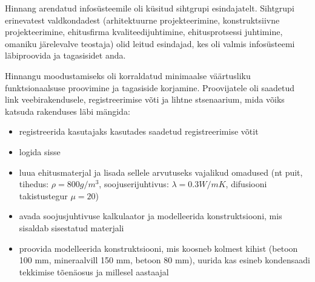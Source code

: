 \label{chapters:feedback}
Hinnang arendatud infosüsteemile oli küsitud sihtgrupi esindajatelt. Sihtgrupi erinevatest valdkondadest (arhitektuurne projekteerimine,
konstruktsiivne projekteerimine, ehitusfirma kvaliteedijuhtimine, ehitusprotsessi juhtimine, omaniku järelevalve teostaja) olid leitud
esindajad, kes oli valmis infosüsteemi läbiproovida ja tagasisidet anda.

Hinnangu moodustamiseks oli korraldatud minimaalse väärtusliku funktsionaalsuse proovimine ja tagasiside korjamine. Proovijatele oli saadetud link
veebirakendusele, registreerimise võti ja lihtne stsenaarium, mida võiks katsuda rakenduses läbi mängida:
\begin{itemize}
    \item registreerida kasutajaks kasutades saadetud registreerimise võtit
    \item logida sisse
    \item luua ehitusmaterjal ja lisada sellele arvutuseks vajalikud omadused (nt puit, tihedus: \begin{math}\rho = 800 g/m^3\end{math}, 
    soojuserijuhtivus: \begin{math}\lambda = 0.3 W/mK\end{math}, difusiooni takistustegur  \begin{math}\mu = 20 \end{math})
    \item avada soojusjuhtivuse kalkulaator ja modelleerida konstruktsiooni, mis sisaldab sisestatud materjali
    \item proovida modelleerida konstruktsiooni, mis koosneb kolmest kihist (betoon 100 mm, mineraalvill 150 mm, betoon 80 mm),
    uurida kas esineb kondensaadi tekkimise tõenäosus ja millesel aastaajal
\end{itemize} 

